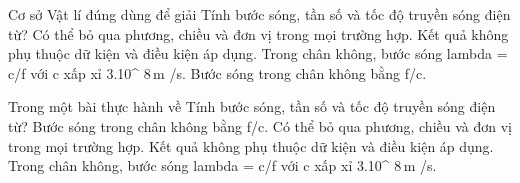 \begin{ex}
Cơ sở Vật lí đúng dùng để giải Tính bước sóng, tần số và tốc độ truyền sóng điện từ?
\choice
{Có thể bỏ qua phương, chiều và đơn vị trong mọi trường hợp.}
{Kết quả không phụ thuộc dữ kiện và điều kiện áp dụng.}
{\True Trong chân không, bước sóng lambda = c/f với c xấp xỉ 3.10^ $8\,\text{m}$ /s.}
{Bước sóng trong chân không bằng f/c.}
\end{ex}

\begin{ex}
Trong một bài thực hành về Tính bước sóng, tần số và tốc độ truyền sóng điện từ?
\choice
{Bước sóng trong chân không bằng f/c.}
{Có thể bỏ qua phương, chiều và đơn vị trong mọi trường hợp.}
{Kết quả không phụ thuộc dữ kiện và điều kiện áp dụng.}
{\True Trong chân không, bước sóng lambda = c/f với c xấp xỉ 3.10^ $8\,\text{m}$ /s.}
\end{ex}
